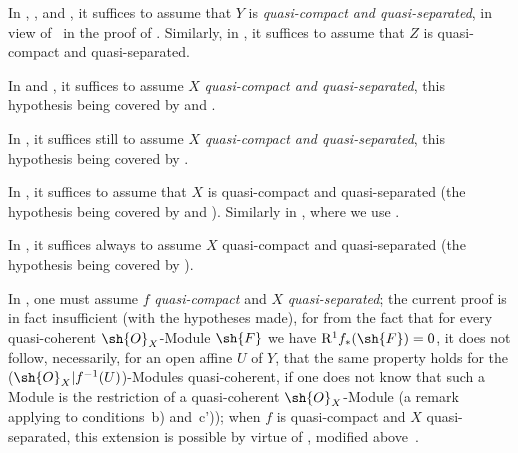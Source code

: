 \begin{env}[1.7.13]
\label{IV.1.7.13}
In , , and , it suffices to assume that $Y$ is \emph{quasi-compact and quasi-separated}, in view of~ in the proof of .
Similarly, in , it suffices to assume that $Z$ is quasi-compact and quasi-separated.
\end{env}

\begin{env}[1.7.14]
\label{IV.1.7.14}
In  and , it suffices to assume $X$ \emph{quasi-compact and quasi-separated}, this hypothesis being covered by  and .
\end{env}

\begin{env}[1.7.15]
\label{IV.1.7.15}
In , it suffices still to assume $X$ \emph{quasi-compact and quasi-separated}, this hypothesis being covered by .
\end{env}

\begin{env}[1.7.16]
\label{IV.1.7.16}
In , it suffices to assume that $X$ is quasi-compact and quasi-separated (the hypothesis being covered by  and ).
Similarly in , where we use .
\end{env}

\begin{env}[1.7.17]
\label{IV.1.7.17}
In , it suffices always to assume $X$ quasi-compact and quasi-separated (the hypothesis being covered by ).
\end{env}

\begin{env}[1.7.18]
\label{IV.1.7.18}
In , one must assume $f$ \emph{quasi-compact} and $X$ \emph{quasi-separated}; the current proof is in fact insufficient (with the hypotheses made), for from the fact that for every quasi-coherent $\sh{O}_X$-Module $\sh{F}$ we have $\mathrm{R}^1 f_*(\sh{F})=0$, it does not follow, necessarily, for an open affine $U$ of $Y$, that the same property holds for the ($\sh{O}_X|f^{-1}(U)$)-Modules quasi-coherent, if one does not know that such a Module is the restriction of a quasi-coherent $\sh{O}_X$-Module (a remark applying to conditions~b) and~c')); when $f$ is quasi-compact and $X$ quasi-separated, this extension is possible by virtue of , modified above~.
\end{env}

